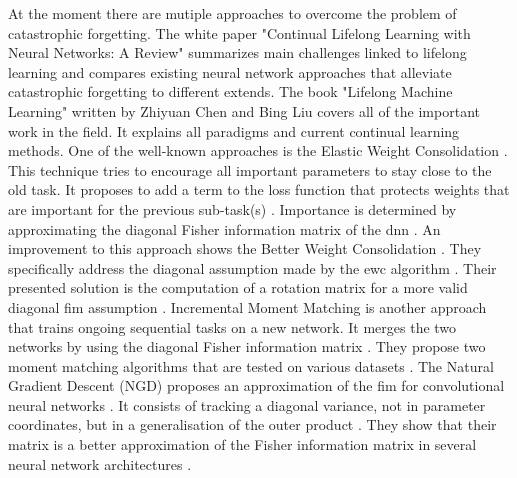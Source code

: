 At the moment there are mutiple approaches to overcome the problem of catastrophic forgetting.
The white paper "Continual Lifelong Learning with Neural Networks: A Review" \cite{lifelong_learning_review} summarizes main challenges linked to lifelong learning and compares existing neural network approaches that alleviate catastrophic forgetting to different extends.
The book "Lifelong Machine Learning" \cite{lifelong-machine-learning-book} written by Zhiyuan Chen and Bing Liu covers all of the important work in the field.
It explains all paradigms and current continual learning methods.
\newline
One of the well-known approaches is the Elastic Weight Consolidation \cite{elastic-weight-consolidation}.
This technique tries to encourage all important parameters to stay close to the old task.
It proposes to add a term to the loss function that protects weights that are important for the previous sub-task(s) \cite{elastic-weight-consolidation}. 
Importance is determined by approximating the diagonal Fisher information matrix of the \acrshort{dnn} \cite{cf_application_oriented_study, elastic-weight-consolidation}.
An improvement to this approach shows the Better Weight Consolidation \cite{better-weight-consolidation}.
They specifically address the diagonal assumption made by the \acrshort{ewc} algorithm \cite{better-weight-consolidation}.
Their presented solution is the computation of a rotation matrix for a more valid diagonal \acrshort{fim} assumption \cite{better-weight-consolidation}.
\newline
Incremental Moment Matching is another approach that trains ongoing sequential tasks on a new network.
It merges the two networks by using the diagonal Fisher information matrix \cite{incremental-moment-matching}.
They propose two moment matching algorithms that are tested on various datasets \cite{incremental-moment-matching}.
\newline
The Natural Gradient Descent (NGD) proposes an approximation of the \acrshort{fim} for convolutional neural networks \cite{natural_gradient_descent}.
It consists of tracking a diagonal variance, not in parameter coordinates, but in a generalisation of the outer product \cite{natural_gradient_descent}.
They show that their matrix is a better approximation of the Fisher information matrix in several neural network architectures \cite{natural_gradient_descent}.
\newline
